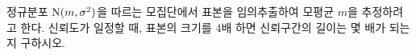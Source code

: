 정규분포 $\mathrm{N}(m{,}\mkern3mu\mathopen{}\sigma^2)$을 따르는 모집단에서 표본을 임의추출하여 모평균 $m$을 추정하려고 한다. 신뢰도가 일정할 때, 표본의 크기를 4배 하면 신뢰구간의 길이는 몇 배가 되는지 구하시오.

